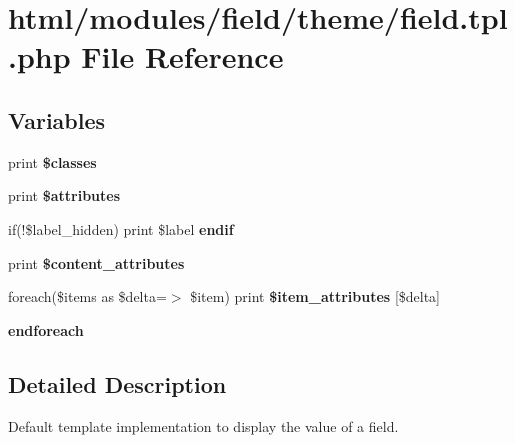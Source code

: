 \hypertarget{field_8tpl_8php}{
\section{html/modules/field/theme/field.tpl.php File Reference}
\label{field_8tpl_8php}
}
\subsection*{Variables}
\begin{DoxyCompactItemize}
\item 
\hypertarget{field_8tpl_8php_a6d48ecbdbc70ca1812e665169b5fa1e2}{
print {\bfseries \$classes}}
\label{field_8tpl_8php_a6d48ecbdbc70ca1812e665169b5fa1e2}

\item 
\hypertarget{field_8tpl_8php_a9c88c4272fa40546577b45392a0b3cd3}{
print {\bfseries \$attributes}}
\label{field_8tpl_8php_a9c88c4272fa40546577b45392a0b3cd3}

\item 
\hypertarget{field_8tpl_8php_a5445124067bcd5ef62e9449182ae480b}{
if(!\$label\_\-hidden) print \$label {\bfseries endif}}
\label{field_8tpl_8php_a5445124067bcd5ef62e9449182ae480b}

\item 
\hypertarget{field_8tpl_8php_ae2ee2e16f11937564281332a76a658e8}{
print {\bfseries \$content\_\-attributes}}
\label{field_8tpl_8php_ae2ee2e16f11937564281332a76a658e8}

\item 
\hypertarget{field_8tpl_8php_a94a936c43d93a05e0c5cb245dad86649}{
foreach(\$items as \$delta=$>$ \$item) print {\bfseries \$item\_\-attributes} \mbox{[}\$delta\mbox{]}}
\label{field_8tpl_8php_a94a936c43d93a05e0c5cb245dad86649}

\item 
\hypertarget{field_8tpl_8php_a672d9707ef91db026c210f98cc601123}{
{\bfseries endforeach}}
\label{field_8tpl_8php_a672d9707ef91db026c210f98cc601123}

\end{DoxyCompactItemize}


\subsection{Detailed Description}
Default template implementation to display the value of a field.

